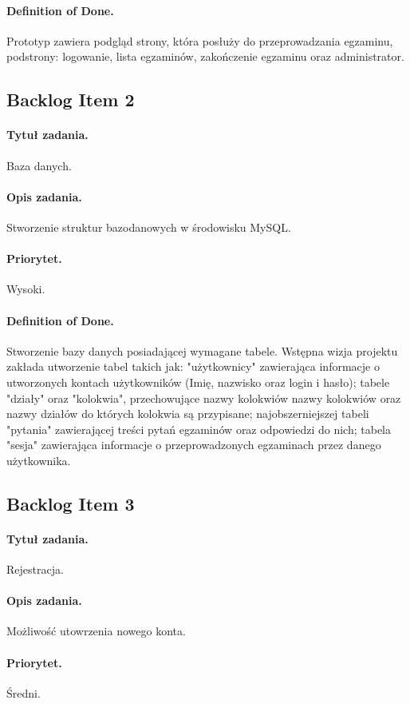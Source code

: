 \documentclass[a4paper]{article}
\begin{document}
\paragraph{Definition of Done.} Prototyp zawiera podgląd strony, która posłuży do przeprowadzania egzaminu, podstrony: logowanie, lista egzaminów, zakończenie egzaminu oraz administrator.

\subsection{Backlog Item 2}
\paragraph{Tytuł zadania.} Baza danych.
\paragraph{Opis zadania.} Stworzenie struktur bazodanowych w środowisku MySQL.
\paragraph{Priorytet.} Wysoki.
\paragraph{Definition of Done.} Stworzenie bazy danych posiadającej wymagane tabele. Wstępna wizja projektu zakłada utworzenie tabel takich jak: "użytkownicy" zawierająca informacje o utworzonych kontach użytkowników (Imię, nazwisko oraz login i  hasło); tabele "działy" oraz "kolokwia", przechowujące nazwy kolokwiów nazwy kolokwiów oraz nazwy działów do których kolokwia są przypisane; najobszerniejszej tabeli "pytania" zawierającej treści pytań egzaminów oraz odpowiedzi do nich; tabela "sesja" zawierająca informacje o przeprowadzonych egzaminach przez danego użytkownika.  

\subsection{Backlog Item 3}
\paragraph{Tytuł zadania.} Rejestracja.
\paragraph{Opis zadania.} Możliwość utowrzenia nowego konta.
\paragraph{Priorytet.} Średni.
\end{document}
